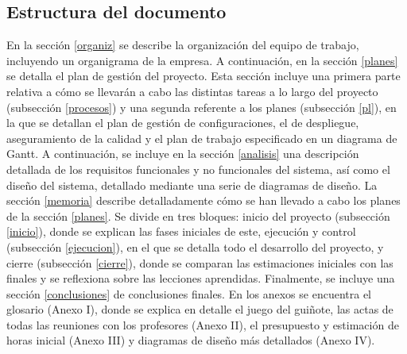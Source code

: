 \documentclass[]{article}
\begin{document}
\clearpage

\subsection{Estructura del documento}
En la sección \ref{organiz} se describe la organización del equipo de trabajo, incluyendo un organigrama de la empresa. A continuación, en la sección \ref{planes} se detalla el plan de gestión del proyecto. Esta sección incluye una primera parte relativa a cómo se llevarán a cabo las distintas tareas a lo largo del proyecto (subsección \ref{procesos}) y una segunda referente a los planes (subsección \ref{pl}), en la que se detallan el plan de gestión de configuraciones, el de despliegue, aseguramiento de la calidad y el plan de trabajo especificado en un diagrama de Gantt. A continuación, se incluye en la sección \ref{analisis} una descripción detallada de los requisitos funcionales y no funcionales del sistema, así como el diseño del sistema, detallado mediante una serie de diagramas de diseño. La sección \ref{memoria} describe detalladamente cómo se han llevado a cabo los planes de la sección \ref{planes}. Se divide en tres bloques: inicio del proyecto (subsección \ref{inicio}), donde se explican las fases iniciales de este, ejecución y control (subsección \ref{ejecucion}), en el que se detalla todo el desarrollo del proyecto, y cierre (subsección \ref{cierre}), donde se comparan las estimaciones iniciales con las finales y se reflexiona sobre las lecciones aprendidas. Finalmente, se incluye una sección \ref{conclusiones} de conclusiones finales. En los anexos se encuentra el glosario (Anexo I), donde se explica en detalle el juego del guiñote, las actas de todas las reuniones con los profesores (Anexo II), el presupuesto y estimación de horas inicial (Anexo III) y diagramas de diseño más detallados (Anexo IV).


\clearpage

\clearpage

\clearpage

\clearpage


\clearpage
\end{document}
